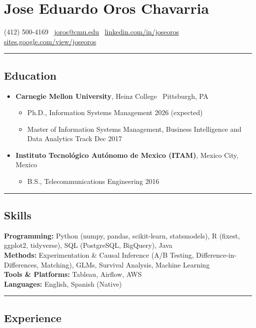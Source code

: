 \documentclass[10pt,letterpaper]{article}
\newcommand{\name}[1]{\section*{#1}}
\newcommand{\sep}{{\color{gray}\,\textbullet\,\,}}
\newcommand{\hsep}{\noindent\textcolor{gray}{\rule{\textwidth}{0.5pt}}}
\newcommand{\block}[1]{\begin{samepage}\hsep\subsection*{#1}\end{samepage}}
\begin{document}
\name{Jose Eduardo Oros Chavarria}

\begin{center}
(412) 500-4169 \sep \href{mailto:joros@cmu.edu}{joros@cmu.edu} \sep \href{https://www.linkedin.com/in/joseoros}{linkedin.com/in/joseoros} \sep \href{https://sites.google.com/view/joseoros}{sites.google.com/view/joseoros}
\end{center}

\block{Education}

\begin{itemize}[leftmargin=0pt, label={}, itemsep=4pt]
\item \textbf{Carnegie Mellon University}, Heinz College \sep Pittsburgh, PA
  \begin{itemize}[label={}]
  \item Ph.D., Information Systems Management \hfill 2026 (expected)
  \item Master of Information Systems Management, Business Intelligence and Data Analytics Track \hfill Dec 2017
  \end{itemize}
\item \textbf{Instituto Tecnol\'ogico Aut\'onomo de Mexico (ITAM)}, Mexico City, Mexico
  \begin{itemize}[label={}]
  \item B.S., Telecommunications Engineering \hfill 2016
  \end{itemize}
\end{itemize}

\block{Skills}

\noindent\textbf{Programming:} Python (numpy, pandas, scikit-learn, statsmodels), R (fixest, ggplot2, tidyverse), SQL (PostgreSQL, BigQuery), Java \\
\textbf{Methods:} Experimentation \& Causal Inference (A/B Testing, Difference-in-Differences, Matching), GLMs, Survival Analysis, Machine Learning \\
\textbf{Tools \& Platforms:} Tableau, Airflow, AWS \\
\textbf{Languages:} English, Spanish (Native)

\block{Experience}
\end{document}
